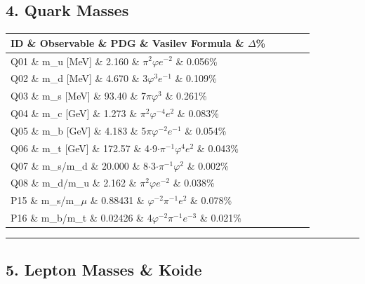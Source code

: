 \subsection{4. Quark Masses}

\begin{tabular}{|l|l|l|l|l|}
\hline
ID \& Observable \& PDG \& Vasilev Formula \& $\Delta$\% \\
\hline
Q01 \& m\_u [MeV] \& 2.160 \& $\pi^{2}\varphi$$e^{-2}$ \& 0.056\% \\
Q02 \& m\_d [MeV] \& 4.670 \& 3$\varphi^{3}$$e^{-1}$ \& 0.109\% \\
Q03 \& m\_s [MeV] \& 93.40 \& 7$\pi\varphi^{3}$ \& 0.261\% \\
Q04 \& m\_c [GeV] \& 1.273 \& $\pi^{2}\varphi^{-4}$$e^{2}$ \& 0.083\% \\
Q05 \& m\_b [GeV] \& 4.183 \& 5$\pi\varphi^{-2}$$e^{-1}$ \& 0.054\% \\
Q06 \& m\_t [GeV] \& 172.57 \& 4$\cdot$9$\cdot\pi^{-1}\varphi^{4}$$e^{2}$ \& 0.043\% \\
Q07 \& m\_s/m\_d \& 20.000 \& 8$\cdot$3$\cdot\pi^{-1}\varphi^{2}$ \& 0.002\% \\
Q08 \& m\_d/m\_u \& 2.162 \& $\pi^{2}\varphi$$e^{-2}$ \& 0.038\% \\
P15 \& m\_s/m\_$\mu$ \& 0.88431 \& $\varphi^{-2}\pi^{-1}$$e^{2}$ \& 0.078\% \\
P16 \& m\_b/m\_t \& 0.02426 \& 4$\varphi^{-2}\pi^{-1}$$e^{-3}$ \& 0.021\% \\
\hline
\end{tabular}
\noindent\rule{\textwidth}{0.4pt}

\subsection{5. Lepton Masses \& Koide}

